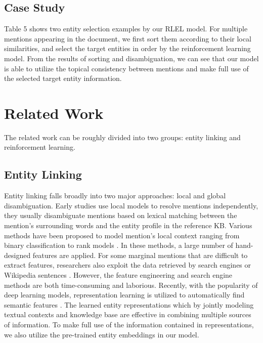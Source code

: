 \documentclass[sigconf]{acmart}
\begin{document}
\subsection{Case Study}
Table 5 shows two entity selection examples by our RLEL model. For multiple mentions appearing in the document, we first sort them according to their local similarities, and select the target entities in order by the reinforcement learning model. From the results of sorting and disambiguation, we can see that our model is able to utilize the topical consistency between mentions and make full use of the selected target entity information.  

\section{Related Work}
The related work can be roughly divided into two groups: entity linking and reinforcement learning.

\subsection{Entity Linking}
Entity linking falls broadly into two major approaches: local and global disambiguation. Early studies use local models to resolve mentions independently, they usually disambiguate mentions based on lexical matching between the mention's surrounding words and the entity profile in the reference KB. Various methods have been proposed to model mention's local context ranging from binary classification \cite{MilneW08} to rank models \cite{DredzeMRGF10, ChenJ11}. In these methods, a large number of hand-designed features are applied. For some marginal mentions that are difficult to extract features, researchers also exploit the data retrieved by search engines \cite{CornoltiFCSR14, CornoltiFCRS16} or Wikipedia sentences \cite{TanWRLZ17}. However, the feature engineering and search engine methods are both time-consuming and laborious. Recently, with the popularity of deep learning models, representation learning is utilized to automatically find semantic features \cite{GuptaSR17, CaoHJCL17}. The learned entity representations which by jointly modeling textual contexts and knowledge base are effective in combining multiple sources of information. To make full use of the information contained in representations, we also utilize the pre-trained entity embeddings in our model.
\end{document}
